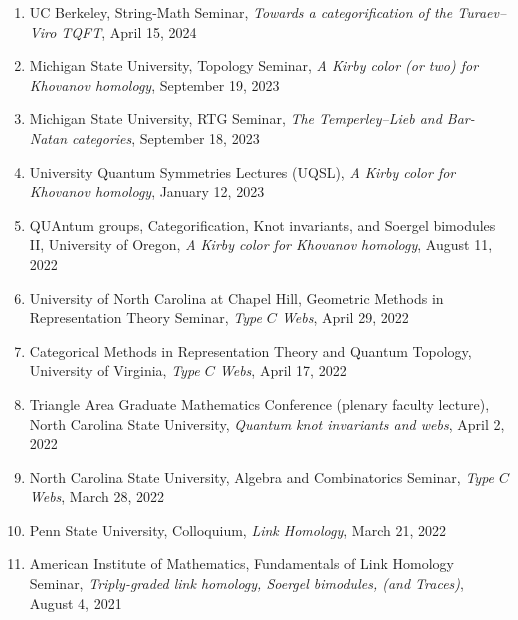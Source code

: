 \documentclass[10pt]{article}
\begin{document}
\begin{enumerate}
\item UC Berkeley, 
String-Math Seminar,
\emph{Towards a categorification of the Turaev--Viro TQFT},
April 15, 2024

\item Michigan State University,
Topology Seminar,
\emph{A Kirby color (or two) for Khovanov homology},
September 19, 2023

\item Michigan State University,
RTG Seminar,
\emph{The Temperley--Lieb and Bar-Natan categories},
September 18, 2023


\item University Quantum Symmetries Lectures (UQSL),
\emph{A Kirby color for Khovanov homology},
January 12, 2023

\item QUAntum groups, Categorification, Knot invariants, and Soergel bimodules II,
University of Oregon,
\emph{A Kirby color for Khovanov homology},
August 11, 2022

\item University of North Carolina at Chapel Hill,
Geometric Methods in Representation Theory Seminar, 
\emph{Type $C$ Webs},
April 29, 2022

\item Categorical Methods in Representation Theory and Quantum Topology,
University of Virginia,
\emph{Type $C$ Webs},
April 17, 2022

\item Triangle Area Graduate Mathematics Conference (plenary faculty lecture), 
North Carolina State University,
\emph{Quantum knot invariants and webs},
April 2, 2022

\item North Carolina State University, Algebra and Combinatorics Seminar, 
\emph{Type $C$ Webs},
March 28, 2022

\item Penn State University, Colloquium, 
\emph{Link Homology},
March 21, 2022

\item American Institute of Mathematics, Fundamentals of Link Homology Seminar,
\emph{Triply-graded link homology, Soergel bimodules, (and Traces)},
August 4, 2021


\end{enumerate}
\end{document}

